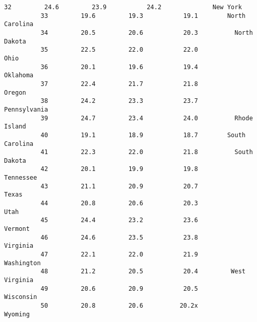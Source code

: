 \documentclass[11pt]{article}
\begin{document}
\begin{Verbatim}[commandchars=\\\{\}]
          32         24.6         23.9           24.2              New York   
          33         19.6         19.3           19.1        North Carolina   
          34         20.5         20.6           20.3          North Dakota   
          35         22.5         22.0           22.0                  Ohio   
          36         20.1         19.6           19.4              Oklahoma   
          37         22.4         21.7           21.8                Oregon   
          38         24.2         23.3           23.7          Pennsylvania   
          39         24.7         23.4           24.0          Rhode Island   
          40         19.1         18.9           18.7        South Carolina   
          41         22.3         22.0           21.8          South Dakota   
          42         20.1         19.9           19.8             Tennessee   
          43         21.1         20.9           20.7                 Texas   
          44         20.8         20.6           20.3                  Utah   
          45         24.4         23.2           23.6               Vermont   
          46         24.6         23.5           23.8              Virginia   
          47         22.1         22.0           21.9            Washington   
          48         21.2         20.5           20.4         West Virginia   
          49         20.6         20.9           20.5             Wisconsin   
          50         20.8         20.6          20.2x               Wyoming   
          

\end{Verbatim}
\end{document}
